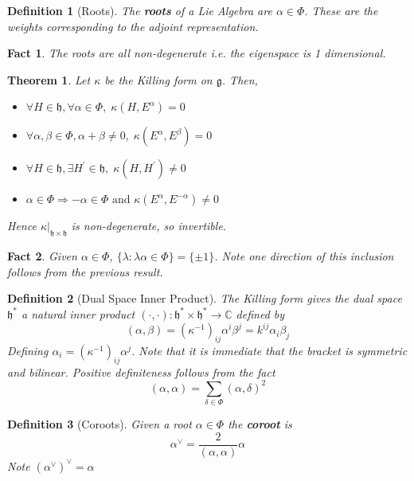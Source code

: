 \documentclass{article}
\newtheorem{theorem}{Theorem}[subsection]
\newtheorem{definition}{Definition}[subsection]
\newtheorem{fact}{Fact}[subsection]
\newcommand{\bam}[1]{\textbf{#1}}
\newcommand{\mf}[1]{\mathfrak{#1}}
\newcommand{\mbb}[1]{\mathbb{#1}}
\begin{document}
\begin{definition}[Roots]
The \bam{roots} of a Lie Algebra are $\alpha\in\Phi$.
These are the weights corresponding to the adjoint representation. 
\end{definition}

\begin{fact}
The roots are all non-degenerate i.e. the eigenspace is 1 dimensional. 
\end{fact}

\begin{theorem}
Let $\kappa$ be the Killing form on $\mf{g}$. Then, 
\begin{itemize}
    \item $\forall H\in\mf{h}, \forall\alpha\in\Phi, \; \kappa\left(H,E^\alpha\right)=0 $
    \item $\forall\alpha,\beta\in\Phi, \alpha+\beta\neq0, \; \kappa\left(E^\alpha,E^\beta\right)=0$
    \item $\forall H\in\mf{h}, \exists H^\prime\in\mf{h}, \; \kappa\left(H,H^\prime\right)\neq0$
    \item $\alpha\in\Phi \Rightarrow -\alpha\in\Phi \text{ and } \kappa\left(E^\alpha,E^{-\alpha}\right)\neq0$
\end{itemize}
Hence $\kappa|_{\mf{h}\times\mf{h}}$ is non-degenerate, so invertible. 
\end{theorem}

\begin{fact}
Given $\alpha\in\Phi$, $\lbrace \lambda : \lambda\alpha\in\Phi \rbrace = \lbrace \pm1 \rbrace$. Note one direction of this inclusion follows from the previous result. 
\end{fact}

\begin{definition}[Dual Space Inner Product]
The Killing form gives the dual space $\mf{h}^\ast$ a natural inner product $(\cdot,\cdot):\mf{h}^\ast \times \mf{h}^\ast \to \mbb{C}$ defined by 
\[
(\alpha, \beta) = \left(\kappa^{-1}\right)_{ij} \alpha^i \beta^j = k^{ij} \alpha_i \beta_j
\]
Defining $\alpha_i=\left( \kappa^{-1} \right)_{ij} \alpha^j$. Note that it is immediate that the bracket is symmetric and bilinear. Positive definiteness follows from the fact
\[
(\alpha, \alpha)=\sum_{\delta\in\Phi} (\alpha, \delta)^2
\]
\end{definition}

\begin{definition}[Coroots]
Given a root $\alpha\in\Phi$ the \bam{coroot} is 
\[
\alpha^\vee=\frac{2}{(\alpha,\alpha)}\alpha
\]
Note $\left( \alpha^\vee \right)^\vee=\alpha$
\end{definition}
\end{document}
